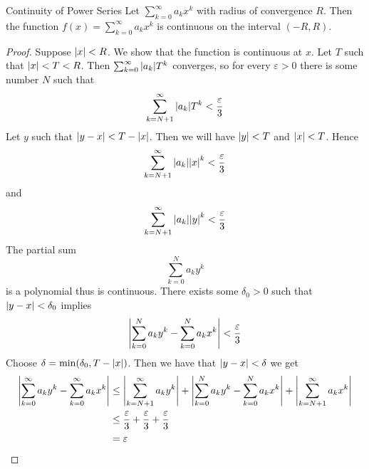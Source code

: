 \documentclass[a4paper]{article}
\begin{document}
\begin{thm}{Continuity of Power Series}{} Let $\sum_{k=0}^{\infty}a_kx^k$ with radius of convergence $R$. Then the function $f(x)=\sum_{k=0}^{\infty}a_kx^k$ is continuous on the interval $(-R,R)$. \tcbline
\begin{proof} Suppose $\abs{x}<R$. We show that the function is continuous at $x$. Let $T$ such that $\abs{x}<T<R$. Then $\sum_{k=0}^\infty\abs{a_k}T^k$ converges, so for every $\varepsilon>0$ there is some number $N$ such that $$\sum_{k=N+1}^\infty\abs{a_k}T^k<\frac{\varepsilon}{3}$$ Let $y$ such that $\abs{y-x}<T-\abs{x}$. Then we will have $\abs{y}<T$ and $\abs{x}<T$. Hence $$\sum_{k=N+1}^\infty\abs{a_k}\abs{x}^k<\frac{\varepsilon}{3}$$ and $$\sum_{k=N+1}^\infty\abs{a_k}\abs{y}^k<\frac{\varepsilon}{3}$$ The partial sum $$\sum_{k=0}^Na_ky^k$$ is a polynomial thus is continuous. There exists some $\delta_0>0$ such that $\abs{y-x}<\delta_0$ implies $$\abs{\sum_{k=0}^Na_ky^k-\sum_{k=0}^Na_kx^k}<\frac{\varepsilon}{3}$$ Choose $\delta=\min(\delta_0,T-\abs{x})$. Then we have that $\abs{y-x}<\delta$ we get 
\begin{align*}
\abs{\sum_{k=0}^\infty a_ky^k-\sum_{k=0}^\infty a_kx^k}&\leq\abs{\sum_{k=N+1}^\infty a_ky^k}+\abs{\sum_{k=0}^Na_ky^k-\sum_{k=0}^Na_kx^k}+\abs{\sum_{k=N+1}^\infty a_kx^k}\\
&\leq\frac{\varepsilon}{3}+\frac{\varepsilon}{3}+\frac{\varepsilon}{3}\\
&=\varepsilon
\end{align*}
\end{proof}
\end{thm}
\end{document}

